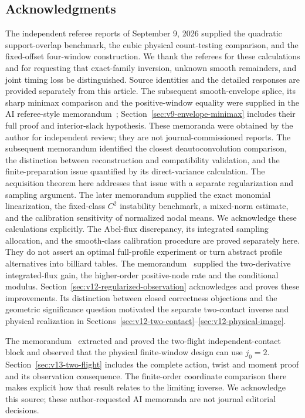 \subsection*{Acknowledgments}
The independent referee reports of September 9, 2026 supplied the
quadratic support-overlap benchmark, the cubic physical count-testing
comparison, and the fixed-offset four-window construction. We thank the
referees for these calculations and for requesting that exact-family
inversion, unknown smooth remainders, and joint timing loss be
distinguished. Source identities and the detailed responses are
provided separately from this article. The subsequent smooth-envelope
splice, its sharp minimax comparison and the positive-window equality
were supplied in the AI referee-style memorandum~\cite{A2ReviewV8};
Section~\ref{sec:v9-envelope-minimax} includes their full proof and
interior-slack hypothesis. These memoranda were obtained by the author
for independent review; they are not journal-commissioned reports. The subsequent memorandum
\cite{A2ReviewV9} identified the closest deautoconvolution comparison,
the distinction between reconstruction and compatibility validation,
and the finite-preparation issue quantified by its direct-variance
calculation. The acquisition theorem here addresses that issue with
a separate regularization and sampling argument. The later memorandum
\cite{A2ReviewV10} supplied the exact monomial linearization,
the fixed-class $C^2$ instability benchmark, a mixed-norm estimate,
and the calibration sensitivity of normalized nodal means. We acknowledge
these calculations explicitly. The Abel-flux discrepancy, its integrated
sampling allocation, and the smooth-class calibration procedure are
proved separately here. They do not assert an optimal full-profile
experiment or turn abstract profile alternatives into billiard tables.
The memorandum~\cite{A2ReviewV11} supplied the two-derivative
integrated-flux gain, the higher-order positive-node rate and the
conditional modulus. Section~\ref{sec:v12-regularized-observation}
acknowledges and proves these improvements. Its distinction between
closed correctness objections and the geometric significance question
motivated the separate two-contact inverse and physical realization
in Sections~\ref{sec:v12-two-contact}--\ref{sec:v12-physical-image}.

The memorandum~\cite{A2ReviewV12} extracted and proved the two-flight
independent-contact block and observed that the physical finite-window
design can use $j_0=2$. Section~\ref{sec:v13-two-flight} includes the
complete action, twist and moment proof and its observation consequence.
The finite-order coordinate comparison there makes explicit how that
result relates to the limiting inverse. We acknowledge this source;
these author-requested AI memoranda are not journal editorial decisions.

